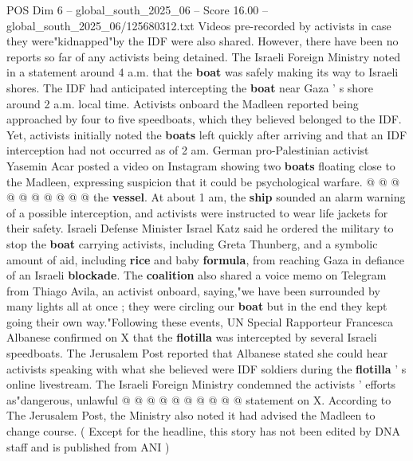 \begin{textsample}{POS Dim 6 – global\_south\_2025\_06 – Score 16.00 – global\_south\_2025\_06/125680312.txt}
Videos pre-recorded by activists in case they were"kidnapped"by the IDF were also shared.
However, there have been no reports so far of any activists being detained.
The Israeli Foreign Ministry noted in a statement around 4 a.m. that the \textbf{boat} was safely making its way to Israeli shores.
The IDF had anticipated intercepting the \textbf{boat} near Gaza ' s shore around 2 a.m. local time.
Activists onboard the Madleen reported being approached by four to five speedboats, which they believed belonged to the IDF.
Yet, activists initially noted the \textbf{boats} left quickly after arriving and that an IDF interception had not occurred as of 2 am.
German pro-Palestinian activist Yasemin Acar posted a video on Instagram showing two \textbf{boats} floating close to the Madleen, expressing suspicion that it could be psychological warfare. @ @ @ @ @ @ @ @ @ @ the \textbf{vessel}.
At about 1 am, the \textbf{ship} sounded an alarm warning of a possible interception, and activists were instructed to wear life jackets for their safety.
Israeli Defense Minister Israel Katz said he ordered the military to stop the \textbf{boat} carrying activists, including Greta Thunberg, and a symbolic amount of aid, including \textbf{rice} and baby \textbf{formula}, from reaching Gaza in defiance of an Israeli \textbf{blockade}.
The \textbf{coalition} also shared a voice memo on Telegram from Thiago Avila, an activist onboard, saying,"we have been surrounded by many lights all at once ; they were circling our \textbf{boat} but in the end they kept going their own way."Following these events, UN Special Rapporteur Francesca Albanese confirmed on X that the \textbf{flotilla} was intercepted by several Israeli speedboats.
The Jerusalem Post reported that Albanese stated she could hear activists speaking with what she believed were IDF soldiers during the \textbf{flotilla} ' s online livestream.
The Israeli Foreign Ministry condemned the activists ' efforts as"dangerous, unlawful @ @ @ @ @ @ @ @ @ @ statement on X.
According to The Jerusalem Post, the Ministry also noted it had advised the Madleen to change course. ( Except for the headline, this story has not been edited by DNA staff and is published from ANI )

\end{textsample}
